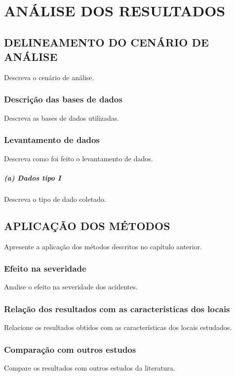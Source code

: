 \chapter{ANÁLISE DOS RESULTADOS}
\label{capitulo3}

\section{DELINEAMENTO DO CENÁRIO DE ANÁLISE}

Descreva o cenário de análise.

\subsection{Descrição das bases de dados}

Descreva as bases de dados utilizadas.

\subsection{Levantamento de dados}

Descreva como foi feito o levantamento de dados.

\paragraph{(a) Dados tipo I}

Descreva o tipo de dado coletado.

\section{APLICAÇÃO DOS MÉTODOS}

Apresente a aplicação dos métodos descritos no capítulo anterior.

\subsection{Efeito na severidade}

Analise o efeito na severidade dos acidentes.

\subsection{Relação dos resultados com as características dos locais}

Relacione os resultados obtidos com as características dos locais estudados.

\subsection{Comparação com outros estudos}

Compare os resultados com outros estudos da literatura.
